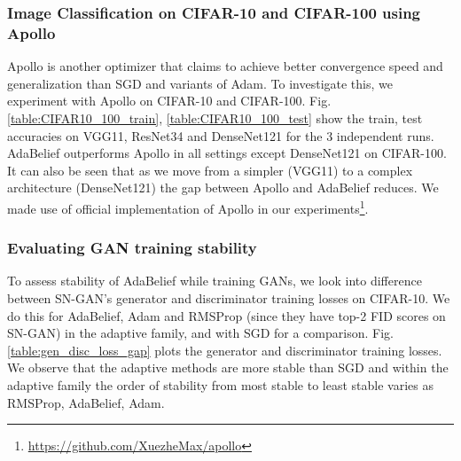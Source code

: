 \subsubsection{Image Classification on CIFAR-10 and CIFAR-100 using Apollo}
Apollo \cite{Apollo} is another optimizer that claims to achieve better convergence speed and generalization than SGD and variants of Adam. To investigate this, we experiment with Apollo on CIFAR-10 and CIFAR-100. Fig. \ref{table:CIFAR10_100_train}, \ref{table:CIFAR10_100_test} show the train, test accuracies on VGG11, ResNet34 and DenseNet121 for the 3 independent runs. AdaBelief outperforms Apollo in all settings except DenseNet121 on CIFAR-100. It can also be seen that as we move from a simpler (VGG11) to a complex architecture (DenseNet121) the gap between Apollo and AdaBelief reduces. We made use of official implementation of Apollo in our experiments\footnote{\href{https://github.com/XuezheMax/apollo}{https://github.com/XuezheMax/apollo}}.



\subsubsection{ Evaluating GAN training stability} 
\label{lab:training_stability}
To assess stability of AdaBelief while training GANs, we look into difference between SN-GAN's generator and discriminator training losses on CIFAR-10. We do this for AdaBelief, Adam and RMSProp (since they have top-2 FID scores on SN-GAN) in the adaptive family, and with SGD for a comparison. Fig. \ref{table:gen_disc_loss_gap} plots the generator and discriminator training losses. We observe that the adaptive methods are more stable than SGD and within the adaptive family the order of stability from most stable to least stable varies as RMSProp, AdaBelief, Adam.

